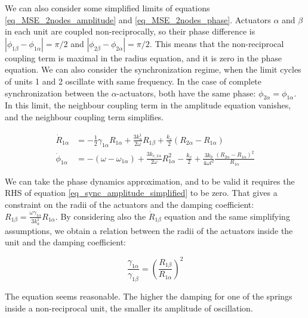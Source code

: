 \documentclass[11pt, a4paper]{article} %
\begin{document}
\begin{appendices}
We can also consider some simplified limits of equations \eqref{eq_MSE_2nodes_amplitude} and \eqref{eq_MSE_2nodes_phase}. 
Actuators $\alpha$ and $\beta$ in each unit are coupled non-reciprocally, so their phase difference is 
$|\phi_{1\beta} - \phi_{1\alpha}| = \pi/2$ and $|\phi_{2\beta} - \phi_{2\alpha}| = \pi/2$. 
This means that the non-reciprocal coupling term is maximal in the radius equation, and it is zero in the phase equation.
We can also consider the synchronization regime, when the limit cycles of units 1 and 2 oscillate with same frequency. 
In the case of complete synchronization between the $\alpha$-actuators, both have the same phase: $\phi_{2\alpha} = \phi_{1\alpha}$. 
In this limit, the neighbour coupling term in the amplitude equation vanishes, and the neighbour coupling term simplifies. 

\begin{align}
\dot{R}_{1\alpha} &= -\frac{1}{2} \gamma_{1\alpha} R_{1\alpha} + \frac{3k_a^{1}}{2\omega} R_{1\beta} 
+ \frac{k_v}{2} (R_{2\alpha} - R_{1\alpha}) \\ %
\dot{\phi}_{1\alpha} &= -(\omega - \omega_{1\alpha}) + \frac{3k_{c,1\alpha}}{2\omega} R_{1\alpha}^2  
- \frac{k_v}{2} + \frac{3k_b}{4\omega l^2} \frac{(R_{2\alpha}-R_{1\alpha})^2}{R_{1\alpha}}
\end{align}

We can take the phase dynamics approximation, and to be valid it requires the RHS of equation \eqref{eq_sync_amplitude_simplified} to be zero.
That gives a constraint on the radii of the actuators and the damping coefficient: 
$R_{1\beta} = \frac{\omega \gamma_{1\alpha}}{3k_a^{1}} R_{1\alpha}$.
By considering also the $\dot{R}_{1\beta}$ equation and the same simplifying assumptions, we obtain a
relation between the radii of the actuators inside the unit and the damping coefficient:

\begin{equation}
    \frac{\gamma_{1\alpha}}{\gamma_{1\beta}} = \left(\frac{R_{1\beta}}{R_{1\alpha}}\right)^2
\end{equation}

The equation seems reasonable. The higher the damping for one of the springs inside a non-reciprocal unit, 
the smaller its amplitude of oscillation. 


\end{appendices}
\end{document}
